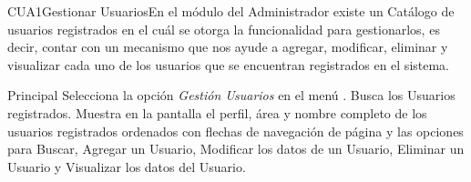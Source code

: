 

\begin{UseCase}{CUA1}{Gestionar Usuarios}{En el módulo del Administrador existe un Catálogo de usuarios registrados en el cuál se otorga la funcionalidad para gestionarlos, es decir, contar con un mecanismo que nos ayude a agregar, modificar, eliminar y visualizar cada uno de los usuarios que se encuentran registrados en el sistema.}
	\end{UseCase}
	
	
	
	
	
	\begin{UCtrayectoria}{Principal}
		\UCpaso[\UCactor] Selecciona la opción \textit{Gestión Usuarios} en el menú .
		\UCpaso Busca los Usuarios registrados.\label{Paso:CUA1BuscaUsuarios}
		\UCpaso Muestra en la pantalla el perfil, área y nombre completo de los usuarios registrados ordenados con flechas de navegación de página y las opciones para Buscar, Agregar un Usuario, Modificar los datos de un Usuario, Eliminar un Usuario y Visualizar los datos del Usuario.   %
	\end{UCtrayectoria}

